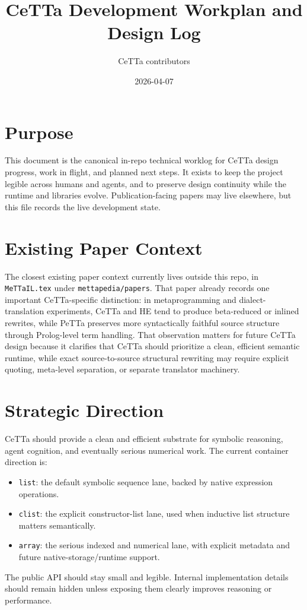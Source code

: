 \documentclass[11pt]{article}
\title{CeTTa Development Workplan and Design Log}
\author{CeTTa contributors}
\date{2026-04-07}
\begin{document}
\maketitle

\section{Purpose}
This document is the canonical in-repo technical worklog for CeTTa design progress, work in flight, and planned next steps. It exists to keep the project legible across humans and agents, and to preserve design continuity while the runtime and libraries evolve. Publication-facing papers may live elsewhere, but this file records the live development state.

\section{Existing Paper Context}
The closest existing paper context currently lives outside this repo, in \texttt{MeTTaIL.tex} under \texttt{mettapedia/papers}. That paper already records one important CeTTa-specific distinction: in metaprogramming and dialect-translation experiments, CeTTa and HE tend to produce beta-reduced or inlined rewrites, while PeTTa preserves more syntactically faithful source structure through Prolog-level term handling. That observation matters for future CeTTa design because it clarifies that CeTTa should prioritize a clean, efficient semantic runtime, while exact source-to-source structural rewriting may require explicit quoting, meta-level separation, or separate translator machinery.

\section{Strategic Direction}
CeTTa should provide a clean and efficient substrate for symbolic reasoning, agent cognition, and eventually serious numerical work. The current container direction is:
\begin{itemize}
  \item \texttt{list}: the default symbolic sequence lane, backed by native expression operations.
  \item \texttt{clist}: the explicit constructor-list lane, used when inductive list structure matters semantically.
  \item \texttt{array}: the serious indexed and numerical lane, with explicit metadata and future native-storage/runtime support.
\end{itemize}
The public API should stay small and legible. Internal implementation details should remain hidden unless exposing them clearly improves reasoning or performance.
\end{document}
